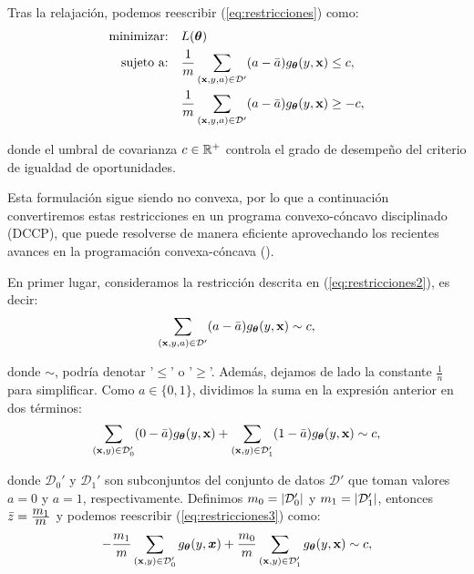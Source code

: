 \documentclass[oneside,openright,titlepage,numbers=noenddot,openany,headinclude,footinclude=true,
cleardoublepage=empty,abstractoff,BCOR=5mm,paper=a4,fontsize=12pt,main=spanish]{scrreprt}
\begin{document}
Tras la relajación, podemos reescribir (\ref{eq:restricciones}) como:
\begin{equation}\label{eq:restricciones2}
\begin{split}
\text{minimizar:} &\quad L(\bm{\theta})\\
\text{sujeto a:} &\quad \frac{1}{m} \sum_{(\textbf{x},y,a)\in \mathcal D'} (a-\bar{a})g_{\bm{\theta}}(y,\textbf{x}) \leq c,\\
&\quad \frac{1}{m} \sum_{(\textbf{x},y,a)\in \mathcal D'} (a-\bar{a})g_{\bm{\theta}}(y,\textbf{x})  \geq -c,
\end{split}
\end{equation}

donde el umbral de covarianza $c \in \mathbb{R}^+$ controla el grado de desempeño del criterio de igualdad de oportunidades.

Esta formulación sigue siendo no convexa, por lo que a continuación convertiremos estas restricciones en un programa convexo-cóncavo disciplinado (DCCP), que puede resolverse de manera eficiente aprovechando los recientes avances en la programación convexa-cóncava (\cite{convex2016}).

En primer lugar, consideramos la restricción descrita en (\ref{eq:restricciones2}), es decir:
\begin{equation*}
\sum_{(\textbf{x},y,a)\in \mathcal{D}'} (a-\bar{a})g_{\bm{\theta}} (y,\textbf{x}) \sim c,
\end{equation*}

donde $\sim$, podría denotar '$\leq$' o '$\geq$'. Además, dejamos de lado la constante $\frac{1}{n}$ para simplificar. Como $a \in \{0,1\}$, dividimos la suma en la expresión anterior en dos términos:
\begin{equation} \label{eq:restricciones3}
\sum_{(\textbf{x},y)\in \mathcal{D}_0'} (0-\bar{a})g_{\bm{\theta}} (y,\textbf{x})+\sum_{(\textbf{x},y)\in \mathcal{D}_1'} (1-\bar{a})g_{\bm{\theta}} (y,\textbf{x}) \sim c,
\end{equation}

donde $\mathcal{D}_0'$ y $\mathcal{D}_1'$ son subconjuntos del conjunto de datos $\mathcal{D'}$ que toman valores $a=0$ y $a=1$, respectivamente. Definimos $m_0=\left\lvert\mathcal{D}_0'\right\rvert$ y $m_1=\left\lvert\mathcal{D}_1'\right\rvert$, entonces $\bar{z}=\frac{\displaystyle m_1}{\displaystyle m}$ y podemos reescribir (\ref{eq:restricciones3}) como:
\begin{equation*}
-\frac{\displaystyle m_1}{\displaystyle m} \sum_{(\textbf{x},y)\in \mathcal{D}_0'} g_{\bm{\theta}} (y,\bm{x})+\frac{\displaystyle m_0}{\displaystyle m} \sum_{(\textbf{x},y)\in \mathcal{D}_1'} g_{\bm{\theta}} (y,\textbf{x}) \sim c,
\end{equation*}
\end{document}
